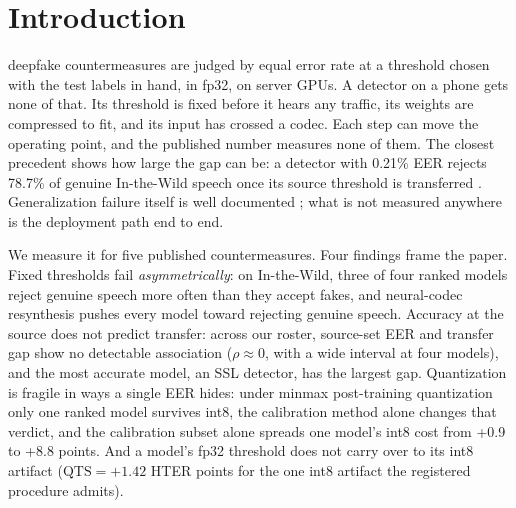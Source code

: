 \documentclass[journal]{IEEEtran}
\newcommand{\qts}{\mathrm{QTS}}
\begin{document}
\section{Introduction}
\label{sec:intro}
 deepfake countermeasures are judged by equal error
rate at a threshold chosen with the test labels in hand, in fp32, on server
GPUs. A detector on a phone gets none of that. Its threshold is fixed before it
hears any traffic, its weights are compressed to fit, and its input has crossed
a codec. Each step can move the operating point, and the published number
measures none of them. The closest precedent shows how large the gap can be: a
detector with 0.21\% EER rejects 78.7\% of genuine In-the-Wild speech once its
source threshold is transferred \cite{zhou26_eer_hides}. Generalization
failure itself is well documented \cite{muller22_in_the_wild,berisha25_coverage_debt};
what is not measured anywhere is the deployment path end to end.

We measure it for five published countermeasures. Four findings frame the paper.
Fixed thresholds fail \emph{asymmetrically}: on In-the-Wild, three of four ranked
models reject genuine speech more often than they accept fakes, and neural-codec
resynthesis pushes every model toward rejecting genuine speech. Accuracy at the
source does not predict transfer: across our roster, source-set EER and
transfer gap show no detectable association (\(\rho\approx0\), with a wide
interval at four models), and the most accurate model, an SSL detector, has the
largest gap. Quantization is fragile in ways a single EER hides: under
minmax post-training quantization only one ranked model survives int8, the
calibration method alone changes that verdict, and the calibration subset alone
spreads one model's int8 cost from +0.9 to +8.8 points. And a model's fp32 threshold does
not carry over to its int8 artifact (\(\qts=+1.42\) HTER points for the one int8
artifact the registered procedure admits).
\end{document}
